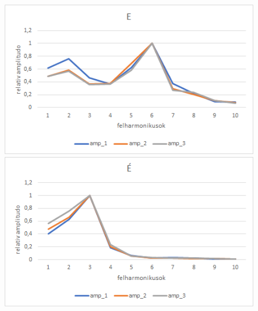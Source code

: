 \documentclass[a4paper,12pt]{article}
\begin{document}
\begin{figure}[h!]
\centering
\begin{minipage}{.5\textwidth}
  \centering
  \includegraphics[width=.9\linewidth]{E.png}
\end{minipage}%
\begin{minipage}{.5\textwidth}
  \centering
  \includegraphics[width=.9\linewidth]{E_1.png}
\end{minipage}
\end{figure}
\end{document}
